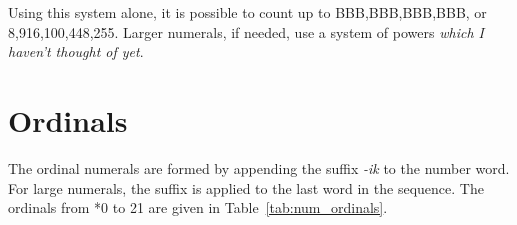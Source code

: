 \documentclass[grammar]{subfiles}
\begin{document}
  Using this system alone, it is possible to count up to BBB,BBB,BBB,BBB\duo, or 8,916,100,448,255\dec. Larger numerals, if needed, use a system of powers \emph{which I haven't thought of yet}.

  \section{Ordinals}
  \label{sec:num_ordinals}

  The ordinal numerals are formed by appending the suffix \textit{-ik} to the number word. For large numerals, the suffix is applied to the last word in the sequence. The ordinals from *0 to 21\dec{} are given in Table~\ref{tab:num_ordinals}.

  \begin{table}[htpb]\small\capstart
      \qquad
      \caption{Ordinal numerals from 0\dec\ to 21\dec\label{tab:num_ordinals}}
  \end{table}
\end{document}
